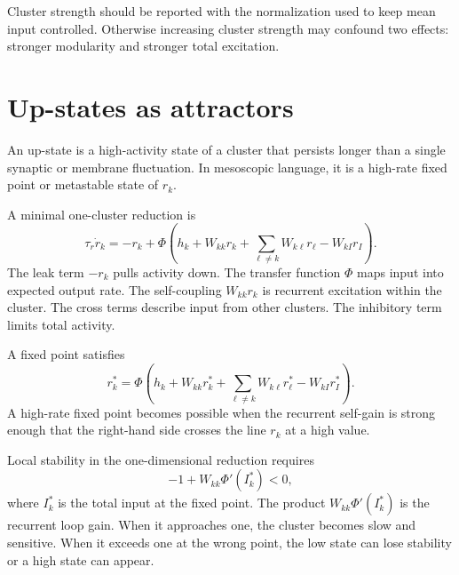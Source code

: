 Cluster strength should be reported with the normalization used to keep mean input controlled. Otherwise increasing cluster strength may confound two effects: stronger modularity and stronger total excitation.

\section{Up-states as attractors}
\label{sec:up-states-as-attractors}

An up-state is a high-activity state of a cluster that persists longer than a single synaptic or membrane fluctuation. In mesoscopic language, it is a high-rate fixed point or metastable state of $r_k$.

A minimal one-cluster reduction is
%
\begin{equation}
  \tau_r\dot r_k
  =
  -r_k
  +
  \Phi\!\left(
    h_k
    +
    W_{kk}r_k
    +
    \sum_{\ell\neq k}W_{k\ell}r_{\ell}
    -
    W_{kI}r_I
  \right).
  \label{eq:cluster-rate-upstate}
\end{equation}
%
The leak term $-r_k$ pulls activity down. The transfer function $\Phi$ maps input into expected output rate. The self-coupling $W_{kk}r_k$ is recurrent excitation within the cluster. The cross terms describe input from other clusters. The inhibitory term limits total activity.

A fixed point satisfies
%
\begin{equation}
  r_k^*
  =
  \Phi\!\left(
    h_k
    +
    W_{kk}r_k^*
    +
    \sum_{\ell\neq k}W_{k\ell}r_{\ell}^*
    -
    W_{kI}r_I^*
  \right).
  \label{eq:cluster-fixed-point-ch05}
\end{equation}
%
A high-rate fixed point becomes possible when the recurrent self-gain is strong enough that the right-hand side crosses the line $r_k$ at a high value.

Local stability in the one-dimensional reduction requires
%
\begin{equation}
  -1
  +
  W_{kk}
  \Phi'\!\left(I_k^*\right)
  <
  0,
  \label{eq:one-cluster-stability}
\end{equation}
%
where $I_k^*$ is the total input at the fixed point. The product $W_{kk}\Phi'(I_k^*)$ is the recurrent loop gain. When it approaches one, the cluster becomes slow and sensitive. When it exceeds one at the wrong point, the low state can lose stability or a high state can appear.

